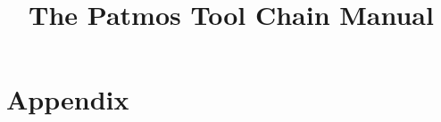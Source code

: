 \documentclass[12pt,twoside,a4paper]{report}
\title{The Patmos Tool Chain Manual}
\begin{document}
\maketitle

\newpage
\tableofcontents

\newpage

\cleardoublepage








\chapter*{Appendix}

\appendix

%



\cleardoublepage

\nocite{Kirner:RTS2010}
\nocite{FFY05}
\nocite{patmos:ppes2011}




\end{document}
